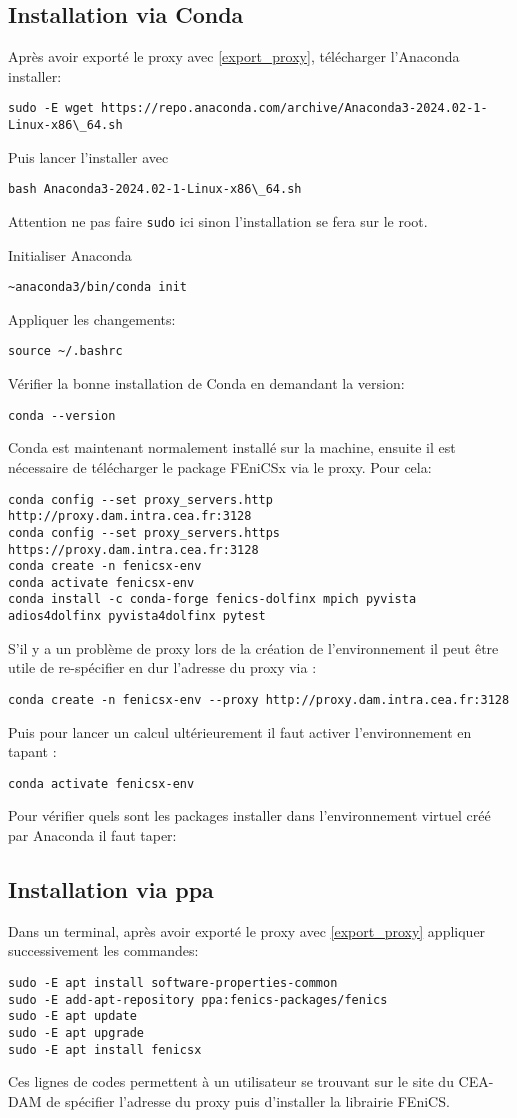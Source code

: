 \documentclass[10pt]{book}
\begin{document}
\subsection{Installation via Conda}\label{Subsection:Conda}
Après avoir exporté le proxy avec \eqref{export_proxy}, télécharger l'Anaconda installer:
\begin{verbatim}
sudo -E wget https://repo.anaconda.com/archive/Anaconda3-2024.02-1-Linux-x86\_64.sh
\end{verbatim}
Puis lancer l'installer avec
\begin{verbatim}
bash Anaconda3-2024.02-1-Linux-x86\_64.sh
\end{verbatim}
\begin{Rem}{Attention ne pas faire \texttt{sudo} ici sinon l'installation se fera sur le root.}\end{Rem}
Initialiser Anaconda
\begin{verbatim}
~anaconda3/bin/conda init
\end{verbatim}
Appliquer les changements:
\begin{verbatim}
source ~/.bashrc
\end{verbatim}
Vérifier la bonne installation de Conda en demandant la version:
\begin{verbatim}
conda --version
\end{verbatim}
Conda est maintenant normalement installé sur la machine, ensuite il est nécessaire de télécharger le package FEniCSx via le proxy. Pour cela:
\begin{verbatim}
conda config --set proxy_servers.http http://proxy.dam.intra.cea.fr:3128
conda config --set proxy_servers.https https://proxy.dam.intra.cea.fr:3128
conda create -n fenicsx-env
conda activate fenicsx-env
conda install -c conda-forge fenics-dolfinx mpich pyvista adios4dolfinx pyvista4dolfinx pytest 
\end{verbatim}
S'il y a un problème de proxy lors de la création de l'environnement il peut être utile de re-spécifier en dur l'adresse du proxy via :
\begin{verbatim}
conda create -n fenicsx-env --proxy http://proxy.dam.intra.cea.fr:3128
\end{verbatim}
Puis pour lancer un calcul ultérieurement il faut activer l'environnement en tapant :
\begin{verbatim}
conda activate fenicsx-env
\end{verbatim}
Pour vérifier quels sont les packages installer dans l'environnement virtuel créé par Anaconda il faut taper:
\subsection{Installation via ppa}\label{Subsection:ppa}
Dans un terminal, après avoir exporté le proxy avec \eqref{export_proxy} appliquer successivement les commandes:
\begin{verbatim}
sudo -E apt install software-properties-common
sudo -E add-apt-repository ppa:fenics-packages/fenics
sudo -E apt update
sudo -E apt upgrade
sudo -E apt install fenicsx
\end{verbatim}
Ces lignes de codes permettent à un utilisateur se trouvant sur le site du CEA-DAM de spécifier l'adresse du proxy puis d'installer la librairie FEniCS.
\end{document}

